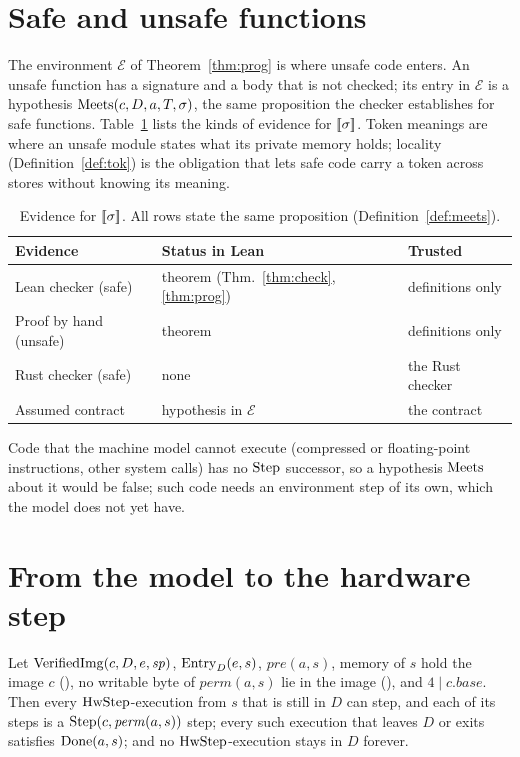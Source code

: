 \section{Safe and unsafe functions}\label{sec:unsafe}
The environment $\mathcal E$ of Theorem~\ref{thm:prog} is where unsafe code enters. An unsafe function has a signature and a body that is not checked; its entry in $\mathcal E$ is a hypothesis $\mathrm{Meets}(c,D,a,T,\sigma)$, the same proposition the checker establishes for safe functions. Table~\ref{tab:evidence} lists the kinds of evidence for $[\![\sigma]\!]$. Token meanings are where an unsafe module states what its private memory holds; locality (Definition~\ref{def:tok}) is the obligation that lets safe code carry a token across stores without knowing its meaning.

\begin{table}[t]
\caption{Evidence for $[\![\sigma]\!]$. All rows state the same proposition (Definition~\ref{def:meets}).}
\label{tab:evidence}
\centering\small
\begin{tabular}{@{}p{24mm}p{26mm}p{25mm}@{}}
\toprule
Evidence & Status in Lean & Trusted\\
\midrule
Lean checker (safe) & theorem (Thm.~\ref{thm:check}, \ref{thm:prog}) & definitions only\\
Proof by hand (unsafe) & theorem & definitions only\\
Rust checker (safe) & none & the Rust checker\\
Assumed contract & hypothesis in $\mathcal E$ & the contract\\
\bottomrule
\end{tabular}
\end{table}

Code that the machine model cannot execute (compressed or floating-point instructions, other system calls) has no $\mathrm{Step}$ successor, so a hypothesis $\mathrm{Meets}$ about it would be false; such code needs an environment step of its own, which the model does not yet have.

\section{From the model to the hardware step}\label{sec:hw}
\begin{claim}\label{thm:hw}
Let $\mathrm{VerifiedImg}(c,D,e,\mathit{sp})$, $\mathrm{Entry}_D(e,s)$, $\mathit{pre}(a,s)$, memory of $s$ hold the image $c$ (), no writable byte of $\mathit{perm}(a,s)$ lie in the image (), and $4\mid c.\mathit{base}$. Then every $\mathrm{HwStep}$-execution from $s$ that is still in $D$ can step, and each of its steps is a $\mathrm{Step}(c,\mathit{perm}(a,s))$ step; every such execution that leaves $D$ or exits satisfies $\mathrm{Done}(a,s)$; and no $\mathrm{HwStep}$-execution stays in $D$ forever.
\end{claim}

